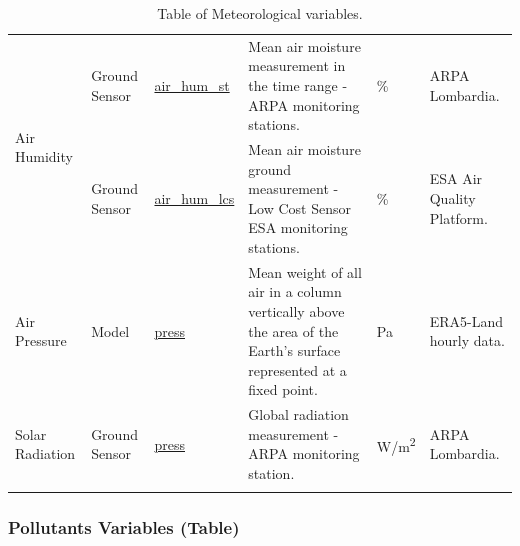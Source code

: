 \begin{center}
\begin{longtable}{ |p{2.3cm}|p{1.8cm}|p{2.3cm}|p{4cm}|p{1cm}|p{2.3cm}| }
\multirow{2}{4em}{Air Humidity} & Ground \newline Sensor  & \underline{air\_hum\_st} & Mean air moisture measurement in the time range - ARPA monitoring stations.\par & \% & ARPA \newline Lombardia.\\ 
& Ground \newline Sensor  & \underline{air\_hum\_lcs} &  Mean air moisture ground measurement - Low Cost Sensor ESA monitoring stations.\par & \% & ESA Air Quality Platform.\\ \hline

\multirow{1}{4em}{Air Pressure} & Model   & \underline{press} & Mean weight of all air in a column vertically above the area of the Earth's surface represented at a fixed point.\par & Pa & ERA5-Land hourly data.\\ \hline

\multirow{1}{4em}{Solar Radiation} & Ground \newline Sensor  & \underline{press} & Global radiation measurement - ARPA monitoring station.\par & W/m\textsuperscript{2} & ARPA \newline Lombardia.\\ \hline

\hline
\caption{Table of Meteorological variables.}

\end{longtable}
\end{center}

\subsubsection{Pollutants Variables (Table)}


